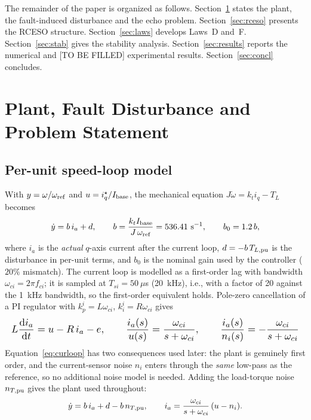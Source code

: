 \documentclass[journal]{IEEEtran}
\theoremstyle{remark}
\begin{document}
The remainder of the paper is organized as follows. Section~\ref{sec:plant} states
the plant, the fault-induced disturbance and the echo problem.
Section~\ref{sec:rceso} presents the RCESO structure. Section~\ref{sec:laws}
develops Laws~D and~F. Section~\ref{sec:stab} gives the stability analysis.
Section~\ref{sec:results} reports the numerical and [TO BE FILLED] experimental
results. Section~\ref{sec:concl} concludes.

\section{Plant, Fault Disturbance and Problem Statement}\label{sec:plant}

\subsection{Per-unit speed-loop model}
With $y=\omega/\omega_{\rm ref}$ and $u=i_q^\star/I_{\rm base}$, the mechanical
equation $J\dot\omega=k_t i_q-T_L$ becomes
\begin{equation}
\dot y=b\,i_a+d,\qquad
b=\frac{k_t I_{\rm base}}{J\,\omega_{\rm ref}}=536.41~\mathrm{s^{-1}},
\qquad b_0=1.2\,b ,
\label{eq:obj}
\end{equation}
where $i_a$ is the \emph{actual} $q$-axis current after the current loop, $d=-b\,T_{L,\rm pu}$
is the disturbance in per-unit terms, and $b_0$ is the nominal gain used by the
controller ($20\%$ mismatch). The current loop is modelled as a first-order lag with
bandwidth $\omega_{ci}=2\pi f_{ci}$; it is sampled at $T_{si}=50~\mu$s (20~kHz), i.e.,
with a factor of 20 against the 1~kHz bandwidth, so the first-order equivalent holds.
Pole-zero cancellation of a PI regulator with $k_p^i=L\omega_{ci}$,
$k_i^i=R\omega_{ci}$ gives
\begin{equation}
\resizebox{\columnwidth}{!}{$\displaystyle
L\frac{\mathrm d i_a}{\mathrm dt}=u-R\,i_a-e,\qquad
\frac{i_a(s)}{u(s)}=\frac{\omega_{ci}}{s+\omega_{ci}},\qquad
\frac{i_a(s)}{n_i(s)}=-\frac{\omega_{ci}}{s+\omega_{ci}}$}
\label{eq:curloop}
\end{equation}
Equation~\eqref{eq:curloop} has two consequences used later: the plant is genuinely
first order, and the current-sensor noise $n_i$ enters through the \emph{same}
low-pass as the reference, so no additional noise model is needed. Adding the
load-torque noise $n_{T,\rm pu}$ gives the plant used throughout:
\begin{equation}
\dot y=b\,i_a+d-b\,n_{T,\rm pu},\qquad
i_a=\frac{\omega_{ci}}{s+\omega_{ci}}\,(u-n_i).
\label{eq:plant}
\end{equation}
\end{document}
